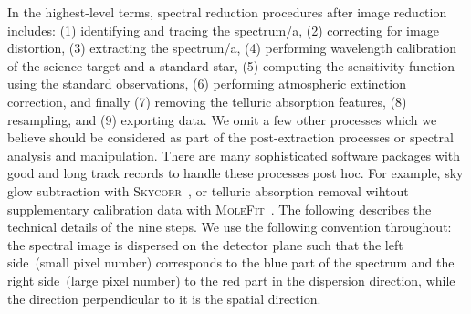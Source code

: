 \documentclass[linenumbers, twocolumn]{aastex631}
\begin{document}
In the highest-level terms, spectral reduction procedures after image reduction
includes: (1) identifying and tracing the spectrum/a, (2) correcting for image
distortion, (3) extracting the spectrum/a, (4) performing wavelength
calibration of the science target and a standard star, (5) computing the
sensitivity function using the standard observations, (6) performing atmospheric
extinction correction, and finally (7) removing the telluric absorption
features, (8) resampling, and (9) exporting data. We omit a few other
processes which we believe should be considered as part of the post-extraction
processes or spectral analysis and manipulation. There are many sophisticated 
software packages with good and long track records to handle these processes
post hoc. For example, sky glow subtraction with
\textsc{Skycorr}~\citep{2014A&A...567A..25N}, or telluric
absorption removal wihtout supplementary calibration data with
\textsc{MoleFit}~\citep{2015A&A...576A..77S, 2015A&A...576A..78K}.
The following describes the technical details of the nine steps. We use the
following convention throughout: the spectral image is dispersed on the detector
plane such that the left side~(small pixel number) corresponds to the blue part
of the spectrum and the right side~(large pixel number) to the red part in the
dispersion direction, while the direction perpendicular to it is the spatial
direction.

\end{document}
